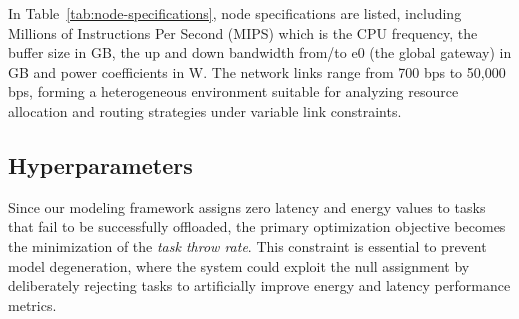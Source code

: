 \documentclass{svproc}
\begin{document}
In Table~\ref{tab:node-specifications}, node specifications are listed, including Millions of Instructions Per Second (MIPS) which is the CPU frequency, the buffer size in GB, the up and down bandwidth from/to e0 (the global gateway) in GB and power coefficients in W. The network links range from 700 bps to 50,000 bps, forming a heterogeneous environment suitable for analyzing resource allocation and routing strategies under variable link constraints.


\begin{table}[h!]
\centering

\caption{Detailed Specifications of Nodes}\label{tab:node-specifications}
\end{table}


\subsection{Hyperparameters}\label{subsec:hyperparameters}


Since our modeling framework assigns zero latency and energy values to tasks that fail to be successfully offloaded, the primary optimization objective becomes the minimization of the \emph{task throw rate}. This constraint is essential to prevent model degeneration, where the system could exploit the null assignment by deliberately rejecting tasks to artificially improve energy and latency performance metrics.
\end{document}
